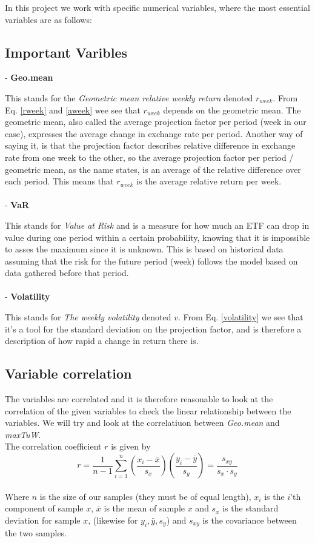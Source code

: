 \documentclass{article}
\begin{document}
In this project we work with specific numerical variables, where the most essential variables are as follows:
\\ 
\subsection{Important Varibles}
- \textbf{Geo.mean}

This stands for the \textit{Geometric mean relative weekly return} denoted $r_{week}$. From Eq. \ref{rweek} and \ref{aweek} wee see that $r_{week}$ depends on the geometric mean. The geometric mean, also called the average projection factor per period (week in our case), expresses the average change in exchange rate per period. Another way of saying it, is that the projection factor describes relative difference in exchange rate from one week to the other, so the average projection factor per period / geometric mean, as the name states, is an average of the relative difference over each period. This means that $r_{week}$ is the average relative return per week. \\
\\
- \textbf{VaR}

This stands for \textit{Value at Risk} and is a measure for how much an ETF can drop in value during one period within a certain probability, knowing that it is impossible to asses the maximum since it is unknown. This is based on historical data assuming that the risk for the future period (week) follows the model based on data gathered before that period. \\
\\
- \textbf{Volatility}

This stands for \textit{The weekly volatility} denoted $v$.  From Eq. \ref{volatility} we  see that it's a tool for the standard deviation on the projection factor, and is therefore a description of how rapid a change in return there is.\\

\subsection{Variable correlation}
The variables are correlated and it is therefore reasonable to look at the correlation of the given variables to check the linear relationship between the variables. We will try and look at the correlatiuon between \textit{Geo.mean} and \textit{maxTuW}.\\

The correlation coefficient $r$ is given by
\begin{equation}\label{covariance}
r=\frac{1}{n-1}\sum_{i=1}^{n}\left(\frac{x_i-\bar{x}}{s_x}\right)\left(\frac{y_i-\bar{y}}{s_y}\right)= \frac{s_{xy}}{s_x\cdot s_y}
\end{equation}
\\
Where $n$ is the size of our samples (they must be of equal length), $x_i$ is the $i$'th component of sample $x$, $\bar{x}$ is the mean of sample $x$ and $s_x$ is the standard deviation for sample $x$, (likewise for $y_i, \bar{y}, s_y$) and $s_{xy}$ is the covariance between the two samples.\\
\end{document}
